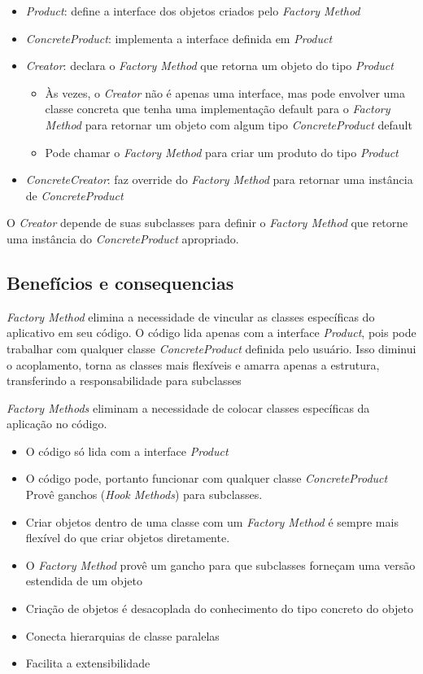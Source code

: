 \begin{itemize}
	\item \emph{Product}: define a interface dos objetos criados pelo \emph{Factory Method}
	\item \emph{ConcreteProduct}: implementa a interface definida em \emph{Product}
	\item \emph{Creator}: declara o \emph{Factory Method} que retorna um objeto do tipo \emph{Product}
		\begin{itemize}
			\item  Às vezes, o \emph{Creator} não é apenas uma interface, mas pode envolver uma
classe concreta que tenha uma implementação default para o \emph{Factory Method} para retornar um objeto com algum tipo \emph{ConcreteProduct} default
			\item Pode chamar o \emph{Factory Method} para criar um produto do tipo \emph{Product}
		\end{itemize}
	\item \emph{ConcreteCreator}: faz override do \emph{Factory Method} para retornar uma instância de \emph{ConcreteProduct}
\end{itemize}

O \emph{Creator} depende de suas subclasses para definir o \emph{Factory Method} que retorne uma instância do \emph{ConcreteProduct} apropriado.


\subsection{Benefícios e consequencias}
\label{sub:fac_conse+benef}

\emph{Factory Method} elimina a necessidade de vincular as classes específicas do aplicativo em seu código. O código lida apenas com a interface \emph{Product}, pois pode trabalhar com qualquer classe \emph{ConcreteProduct} definida pelo usuário. Isso diminui o acoplamento, torna as classes mais flexíveis e amarra apenas a estrutura, transferindo a responsabilidade para subclasses

\emph{Factory Methods} eliminam a necessidade de colocar classes específicas da aplicação no código.\cite{fact2}

\begin{itemize}
	\item O código só lida com a interface \emph{Product}
	\item O código pode, portanto funcionar com qualquer classe \emph{ConcreteProduct} Provê ganchos (\emph{Hook Methods}) para subclasses.
	\item Criar objetos dentro de uma classe com um \emph{Factory Method} é sempre mais flexível do que criar objetos diretamente.
	\item O \emph{Factory Method} provê um gancho para que subclasses forneçam uma versão estendida de um objeto


	\item Criação de objetos é desacoplada do conhecimento do tipo concreto do objeto
	\item Conecta hierarquias de classe paralelas
	\item Facilita a extensibilidade

\end{itemize}

